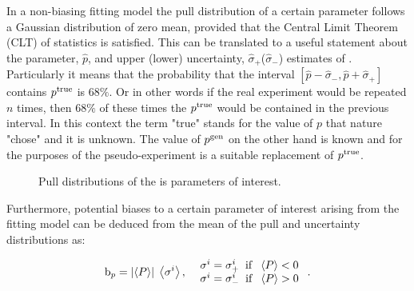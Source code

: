 In a non-biasing fitting model the pull distribution of a certain parameter follows a Gaussian distribution of zero mean,
provided that the Central Limit Theorem (CLT) of statistics is satisfied.
This can be translated to a useful statement about the parameter, $\hat{p}$, and upper (lower) uncertainty, $\hat{\sigma}_+$($\hat{\sigma}_-$)
estimates of . Particularly it means that the probability that the interval
$[\hat{p}-\hat{\sigma}_-,\hat{p}+\hat{\sigma}_+]$ contains $p^{\rm true}$ is $68\%$. Or in other words if the
real experiment would be repeated $n$ times, then $68\%$ of these times the $p^{\rm true}$ would be contained
in the previous interval. In this context the term "true" stands for the value of $p$ that nature "chose"
and it is unknown. The value of $p^{\rm gen}$ on the other hand is known and for the purposes of the pseudo-experiment
is a suitable replacement of $p^{\rm true}$.

\begin{figure}[!t]
  \centering
  \begin{subfigure}{0.5\textwidth}
    \raggedright
    \scalebox{0.56}{}
    \caption{}
    \label{pull_ACP0}
  \end{subfigure}%
  \hfill%
  \begin{subfigure}{0.5\textwidth}
    \raggedleft
    \scalebox{0.56}{}
    \caption{}
    \label{pull_ACPperp}
  \end{subfigure}
  \begin{subfigure}{0.5\textwidth}
    \raggedright
    \scalebox{0.56}{}
    \caption{}
    \label{pull_ACPpar}
  \end{subfigure}%
  \hfill%
  \begin{subfigure}{0.5\textwidth}
    \raggedleft
    \scalebox{0.56}{}
    \caption{}
    \label{pull_ACPS}
  \end{subfigure}
\caption{Pull distributions of the \Acp{i} parameters of interest.}
\label{pull_acp}
\end{figure}

Furthermore, potential biases to a certain parameter of interest arising from the fitting model
can be deduced from the mean of the pull and uncertainty distributions as:

\begin{equation}
{\rm b}_p = \left|\left<P\right>\right| \; \left<\sigma^i\right>,\;\; \left.
  \begin{array}{ll}
    \sigma^i = \sigma^i_+ \;\;{\rm if}\;\; \left<P\right> < 0 \\
    \sigma^i = \sigma^i_- \;\;{\rm if}\;\; \left<P\right> > 0
  \end{array} \right. .
\label{bias_def}
\end{equation}

